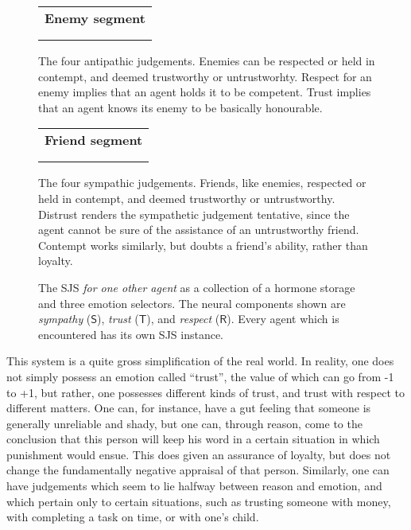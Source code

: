 \begin{figure}
	\centering
	\begin{tabular}{c}
	\textbf{\Large Enemy segment}\\
	\\
	\\
	\end{tabular}
	
	\caption{The four antipathic judgements. Enemies can be respected or held in contempt, and deemed trustworthy or untrustworhty. Respect for an enemy implies that an agent holds it to be competent. Trust implies that an agent knows its enemy to be basically honourable.}
	\label{fig:SJS_enemy}
\end{figure}

\begin{figure}
	\centering
	\begin{tabular}{c}
	\textbf{\Large Friend segment}\\
	\\
	\\
	\end{tabular}
	
	\caption{The four sympathic judgements. Friends, like enemies, respected or held in contempt, and deemed trustworthy or untrustworthy. Distrust renders the sympathetic judgement tentative, since the agent cannot be sure of the assistance of an untrustworthy friend. Contempt works similarly, but doubts a friend's ability, rather than loyalty.}
	\label{fig:SJS_friend}
\end{figure}

\begin{figure}
	\centering
	
	\caption{The SJS {\em for one other agent} as a collection of a hormone storage and three emotion selectors. The neural components shown are {\em sympathy} ($\mathsf{S}$), {\em trust} ($\mathsf{T}$), and {\em respect} ($\mathsf{R}$). Every agent which is encountered has its own SJS instance.}
	\label{fig:SJS_system}
\end{figure}

This system is a quite gross simplification of the real world. In reality, one does not simply possess an emotion called ``trust'', the value of which can go from -1 to +1, but rather, one possesses different kinds of trust, and trust with respect to different matters. One can, for instance, have a gut feeling that someone is generally unreliable and shady, but one can, through reason, come to the conclusion that this person will keep his word in a certain situation in which punishment would ensue. This does given an assurance of loyalty, but does not change the fundamentally negative appraisal of that person. Similarly, one can have judgements which seem to lie halfway between reason and emotion, and which pertain only to certain situations, such as trusting someone with money, with completing a task on time, or with one's child.

